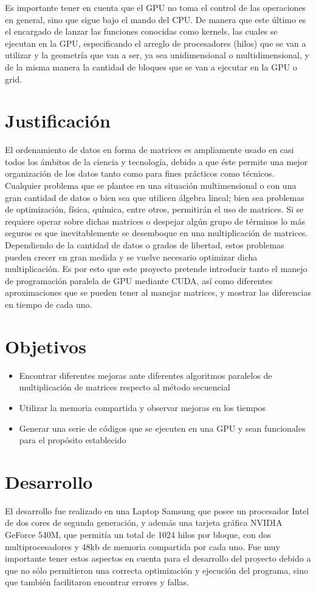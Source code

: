 \documentclass{article}
\begin{document}
Es importante tener en cuenta que el GPU no toma el control de las operaciones en general, sino que sigue bajo el mando del CPU. De manera que este último es el encargado de lanzar las funciones conocidas como kernels, las cuales se ejecutan en la GPU, especificando el arreglo de procesadores (hilos) que se van a utilizar y la geometría que van a ser, ya sea unidimensional o multidimensional, y de la misma manera la cantidad de bloques que se van a ejecutar en la GPU o grid.


\section{Justificación}
El ordenamiento de datos en forma de matrices es ampliamente usado en casi todos los ámbitos de la ciencia y tecnología, debido a que éste permite una mejor organización de los datos tanto como para fines prácticos como técnicos. Cualquier problema que se plantee en una situación multimensional o con una gran cantidad de datos o bien sea que utilicen álgebra lineal; bien sea problemas de optimización, física, química, entre otros, permitirán el uso de matrices. Si se requiere operar sobre dichas matrices o despejar algún grupo de términos lo más seguros es que inevitablemente se desemboque en una multiplicación de matrices. Dependiendo de la cantidad de datos o grados de libertad, estos problemas pueden crecer en gran medida y se vuelve necesario optimizar dicha multiplicación. Es por esto que este proyecto pretende introducir tanto el manejo de programación paralela de GPU mediante CUDA, así como diferentes aproximaciones que se pueden tener al manejar matrices, y mostrar las diferencias en tiempo de cada uno.

\section{Objetivos}
\begin{itemize}
	\item Encontrar diferentes mejoras ante diferentes algoritmos paralelos de multiplicación de matrices respecto al método secuencial
	\item Utilizar la memoria compartida y observar mejoras en los tiempos
	\item Generar una serie de códigos que se ejecuten en una GPU y sean funcionales para el propósito establecido
\end{itemize}
\newpage
\section{Desarrollo}
El desarrollo fue realizado en una Laptop Samsung que posee un procesador Intel de dos cores de segunda generación, y además una tarjeta gráfica NVIDIA GeForce 540M, que permitía un total de 1024 hilos por bloque, con dos multiprocesadores y 48kb de memoria compartida por cada uno. Fue muy importante tener estos aspectos en cuenta para el desarrollo del proyecto debido a que no sólo permitieron una correcta optimización y ejecución del programa, sino que también facilitaron encontrar errores y fallas.
\end{document}
